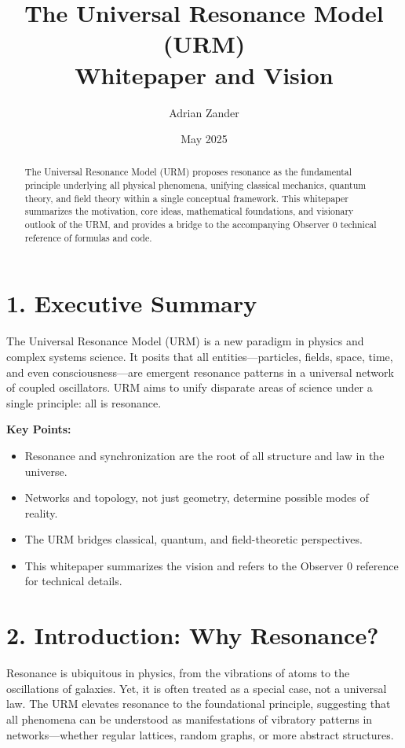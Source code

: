 \documentclass{article}
\title{The Universal Resonance Model (URM)\\\large Whitepaper and Vision}
\author{Adrian Zander}
\date{May 2025}
\begin{document}
\maketitle

\begin{abstract}
The Universal Resonance Model (URM) proposes resonance as the fundamental principle underlying all physical phenomena, unifying classical mechanics, quantum theory, and field theory within a single conceptual framework. This whitepaper summarizes the motivation, core ideas, mathematical foundations, and visionary outlook of the URM, and provides a bridge to the accompanying Observer 0 technical reference of formulas and code.
\end{abstract}

\section*{1. Executive Summary}

The Universal Resonance Model (URM) is a new paradigm in physics and complex systems science. It posits that all entities—particles, fields, space, time, and even consciousness—are emergent resonance patterns in a universal network of coupled oscillators. URM aims to unify disparate areas of science under a single principle: all is resonance.

\vspace{1em}
\textbf{Key Points:}
\begin{itemize}
    \item Resonance and synchronization are the root of all structure and law in the universe.
    \item Networks and topology, not just geometry, determine possible modes of reality.
    \item The URM bridges classical, quantum, and field-theoretic perspectives.
    \item This whitepaper summarizes the vision and refers to the Observer 0 reference for technical details.
\end{itemize}

\section*{2. Introduction: Why Resonance?}

Resonance is ubiquitous in physics, from the vibrations of atoms to the oscillations of galaxies. Yet, it is often treated as a special case, not a universal law. The URM elevates resonance to the foundational principle, suggesting that all phenomena can be understood as manifestations of vibratory patterns in networks—whether regular lattices, random graphs, or more abstract structures.
\end{document}
